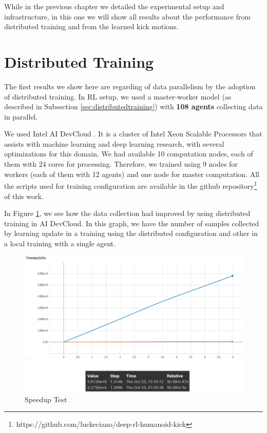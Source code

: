 While in the previous chapter we detailed the experimental setup and infrastructure, in this one we will show all results about the performance from distributed training and from the learned kick motions.

\section{Distributed Training}

The first results we show here are regarding of data parallelism by the adoption of distributed training. In RL setup, we used a master-worker model (as described in Subsection \ref{sec:distributedtraining}) with \textbf{108 agents} collecting data in parallel.

We used Intel AI DevCloud \cite{inteldevcloud}. It is a cluster of Intel Xeon Scalable Processors that assists with machine learning and deep learning research, with several optimizations for this domain. We had available 10 computation nodes, each of them with 24 cores for processing. Therefore, we trained using 9 nodes for workers (each of them with 12 agents) and one node for master computation. All the scripts used for training configuration are available in the github repository\footnote{\label{scripts} https://github.com/luckeciano/deep-rl-humanoid-kick} of this work. 

In Figure \ref{fig:speeduptest}, we see how the data collection had improved by using distributed training in AI DevCloud. In this graph, we have the number of samples collected by learning update in a training using the distributed configuration and other in a local training with a single agent. 

\begin{figure}[!htbp]
	\centering
	\includegraphics[width=1\textwidth]{Cap6/speeduptest}
	\caption{Speedup Test}
	\label{fig:speeduptest}
\end{figure}

